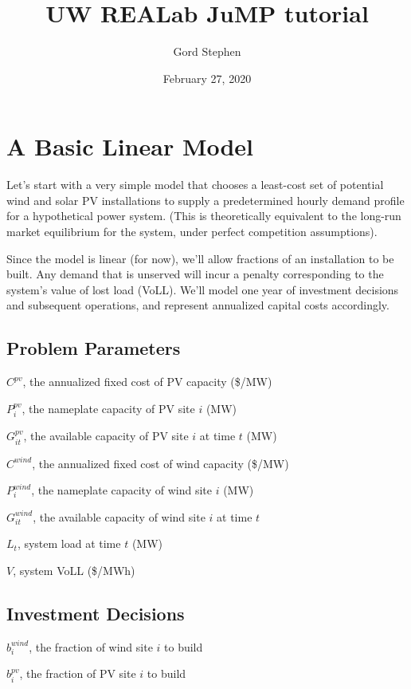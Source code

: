 \documentclass[11pt]{article}
\begin{document}
\title{UW REALab JuMP tutorial}
\author{Gord Stephen}
\date{February 27, 2020}
\maketitle

\section{A Basic Linear Model}

Let's start with a very simple model that chooses a least-cost set of potential wind and solar PV installations to supply a predetermined hourly demand profile for a hypothetical power system. (This is theoretically equivalent to the long-run market equilibrium for the system, under perfect competition assumptions).

Since the model is linear (for now), we'll allow fractions of an installation to be built. Any demand that is unserved will incur a penalty corresponding to the system's value of lost load (VoLL). We'll model one year of investment decisions and subsequent operations, and represent annualized capital costs accordingly.

\subsection{Problem Parameters}

$C^{pv}$, the annualized fixed cost of PV capacity (\$/MW)

$P^{pv}_i$, the nameplate capacity of PV site $i$ (MW)

$G^{pv}_{it}$, the available capacity of PV site $i$ at time $t$ (MW)


$C^{wind}$, the annualized fixed cost of wind capacity (\$/MW)

$P^{wind}_i$, the nameplate capacity of wind site $i$ (MW)

$G^{wind}_{it}$, the available capacity of wind site $i$ at time $t$

$L_t$, system load at time $t$ (MW)

$V$, system VoLL (\$/MWh)

\subsection{Investment Decisions}

$b^{wind}_i$, the fraction of wind site $i$ to build

$b^{pv}_i$, the fraction of PV site $i$ to build
\end{document}
